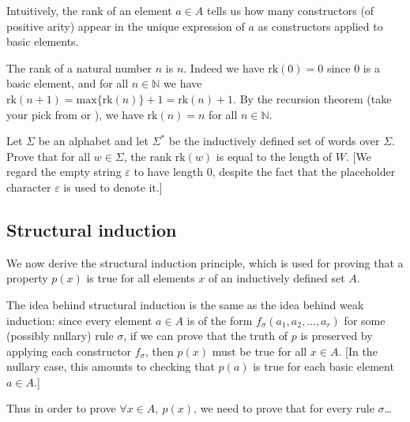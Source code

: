 Intuitively, the rank of an element $a \in A$ tells us how many constructors (of positive arity) appear in the unique expression of $a$ as constructors applied to basic elements.

\begin{example}
The rank of a natural number $n$ is $n$. Indeed we have $\mathrm{rk}(0) = 0$ since $0$ is a basic element, and for all $n \in \mathbb{N}$ we have $\mathrm{rk}(n+1) = \mathrm{max} \{ \mathrm{rk}(n) \} + 1 = \mathrm{rk}(n) + 1$. By the recursion theorem (take your pick from  or ), we have $\mathrm{rk}(n) = n$ for all $n \in \mathbb{N}$.
\end{example}

\begin{exercise}
Let $\Sigma$ be an alphabet and let $\Sigma^*$ be the inductively defined set of words over $\Sigma$. Prove that for all $w \in \Sigma$, the rank $\mathrm{rk}(w)$ is equal to the length of $W$. [We regard the empty string $\varepsilon$ to have length $0$, despite the fact that the placeholder character $\varepsilon$ is used to denote it.]
\end{exercise}

\subsection*{Structural induction}

We now derive the structural induction principle, which is used for proving that a property $p(x)$ is true for all elements $x$ of an inductively defined set $A$.

The idea behind structural induction is the same as the idea behind weak induction: since every element $a \in A$ is of the form $f_{\sigma}(a_1,a_2,\dots,a_r)$ for some (possibly nullary) rule $\sigma$, if we can prove that the truth of $p$ is preserved by applying each constructor $f_{\sigma}$, then $p(x)$ must be true for all $x \in A$. [In the nullary case, this amounts to checking that $p(a)$ is true for each basic element $a \in A$.]

Thus in order to prove $\forall x \in A,~ p(x)$, we need to prove that for every rule $\sigma$\dots{}

\begin{center}
\end{center}

